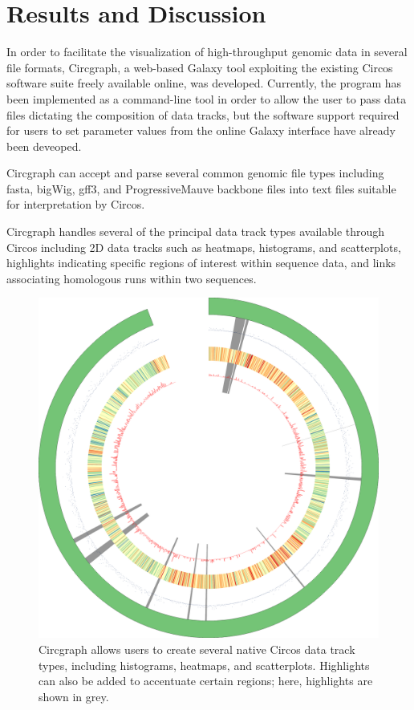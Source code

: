 \documentclass{article}
\begin{document}
\section*{Results and Discussion}

In order to facilitate the visualization of high-throughput genomic data in several file formats, Circgraph, a web-based Galaxy tool exploiting the existing Circos software suite freely available online, was developed. Currently, the program has been implemented as a command-line tool in order to allow the user to pass data files dictating the composition of data tracks, but the software support required for users to set parameter values from the online Galaxy interface have already been deveoped.

Circgraph can accept and parse several common genomic file types including fasta, bigWig, gff3, and ProgressiveMauve backbone files into text files suitable for interpretation by Circos.

Circgraph handles several of the principal data track types available through Circos including 2D data tracks such as heatmaps, histograms, and scatterplots, highlights indicating specific regions of interest within sequence data, and links associating homologous runs within two sequences.

\begin{figure}[H]
\centering
\includegraphics[scale=0.1]{./results/hilite.png}
\caption{Circgraph allows users to create several native Circos data track types, including histograms, heatmaps, and scatterplots. Highlights can also be added to accentuate certain regions; here, highlights are shown in grey.}
\end{figure}
\end{document}
